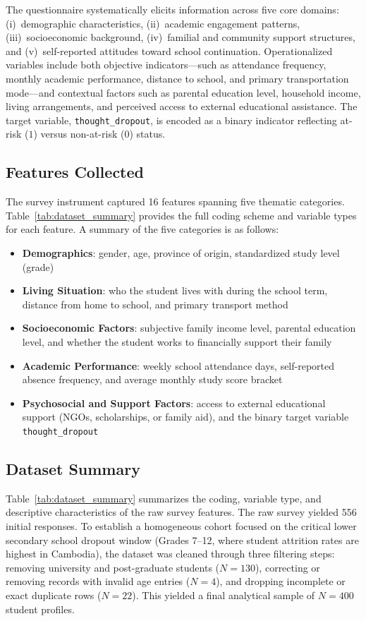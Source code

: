 The questionnaire systematically elicits information across five core domains: (i)~demographic characteristics, (ii)~academic engagement patterns, (iii)~socioeconomic background, (iv)~familial and community support structures, and (v)~self-reported attitudes toward school continuation. Operationalized variables include both objective indicators---such as attendance frequency, monthly academic performance, distance to school, and primary transportation mode---and contextual factors such as parental education level, household income, living arrangements, and perceived access to external educational assistance. The target variable, \texttt{thought\_dropout}, is encoded as a binary indicator reflecting at-risk ($1$) versus non-at-risk ($0$) status.

\subsection{Features Collected}
\label{subsec:features}
The survey instrument captured 16 features spanning five thematic categories. Table~\ref{tab:dataset_summary} provides the full coding scheme and variable types for each feature. A summary of the five categories is as follows:
\begin{itemize}
    \item \textbf{Demographics}: gender, age, province of origin, standardized study level (grade)
    \item \textbf{Living Situation}: who the student lives with during the school term, distance from home to school, and primary transport method
    \item \textbf{Socioeconomic Factors}: subjective family income level, parental education level, and whether the student works to financially support their family
    \item \textbf{Academic Performance}: weekly school attendance days, self-reported absence frequency, and average monthly study score bracket
    \item \textbf{Psychosocial and Support Factors}: access to external educational support (NGOs, scholarships, or family aid), and the binary target variable \texttt{thought\_dropout}
\end{itemize}

\subsection{Dataset Summary}
\label{subsec:dataset_summary}
Table~\ref{tab:dataset_summary} summarizes the coding, variable type, and descriptive characteristics of the raw survey features. The raw survey yielded 556 initial responses. To establish a homogeneous cohort focused on the critical lower secondary school dropout window (Grades 7--12, where student attrition rates are highest in Cambodia), the dataset was cleaned through three filtering steps: removing university and post-graduate students ($N=130$), correcting or removing records with invalid age entries ($N=4$), and dropping incomplete or exact duplicate rows ($N=22$). This yielded a final analytical sample of $N=400$ student profiles.

